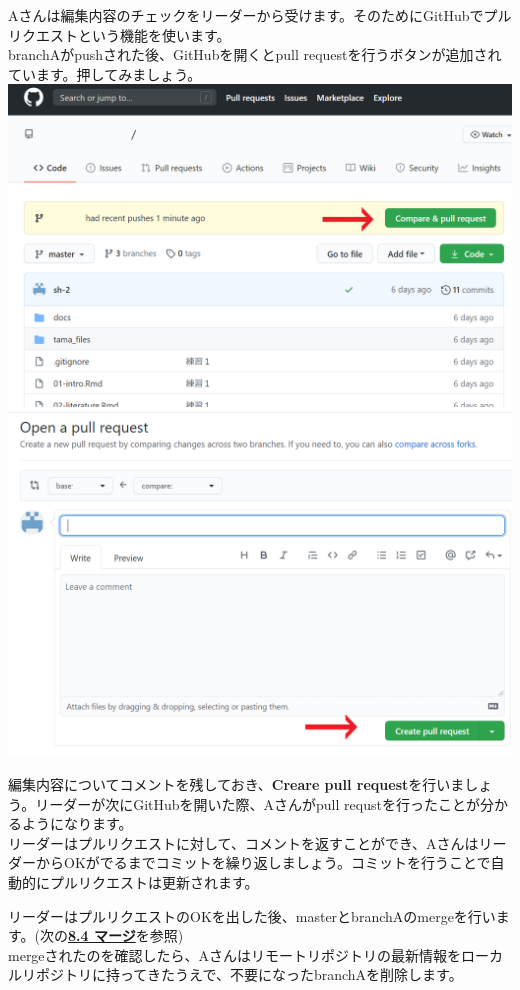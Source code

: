 \documentclass[
]{book}
\begin{document}
Aさんは編集内容のチェックをリーダーから受けます。そのためにGitHubでプルリクエストという機能を使います。\\
branchAがpushされた後、GitHubを開くとpull requestを行うボタンが追加されています。押してみましょう。
\includegraphics{pics/pull request.png}
\includegraphics{pics/pull request 2.png}

編集内容についてコメントを残しておき、\textbf{Creare pull request}を行いましょう。リーダーが次にGitHubを開いた際、Aさんがpull requstを行ったことが分かるようになります。\\
リーダーはプルリクエストに対して、コメントを返すことができ、AさんはリーダーからOKがでるまでコミットを繰り返しましょう。コミットを行うことで自動的にプルリクエストは更新されます。

リーダーはプルリクエストのOKを出した後、masterとbranchAのmergeを行います。(次の\textbf{\protect\hyperlink{ux30deux30fcux30b8}{8.4 マージ}}を参照)\\
mergeされたのを確認したら、Aさんはリモートリポジトリの最新情報をローカルリポジトリに持ってきたうえで、不要になったbranchAを削除します。
\end{document}
